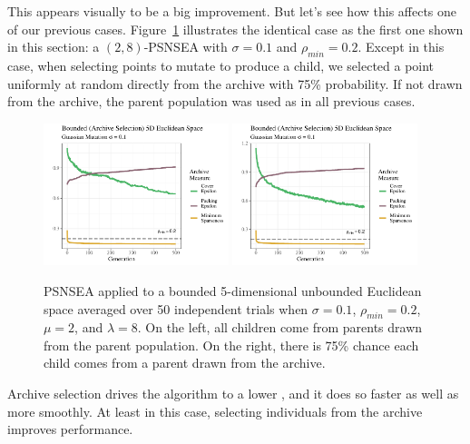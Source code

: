 \documentclass[twoside]{article}
\begin{document}
This appears visually to be a big improvement.  But let's see how this affects one of our previous cases.  Figure~\ref{fig:bounded:viz:mu2lam8:0102} illustrates the identical case as the first one shown in this section:  a $(2,8)$-PSNSEA with $\sigma=0.1$ and $\rho_{min}=0.2$.  Except in this case, when selecting points to mutate to produce a child, we selected a point uniformly at random directly from the archive with 75\% probability.  If not drawn from the archive, the parent population was used as in all previous cases.
%
\begin{figure}[h]
  \includegraphics[width=0.48\textwidth]{Figures/bounded-500-s01r02-mu2lam8.pdf}
  \includegraphics[width=0.48\textwidth]{Figures/boundedrv-500-vizexamp-mu2lam8-full.pdf}
  \caption{\label{fig:bounded:viz:mu2lam8:0102} PSNSEA applied to a bounded 5-dimensional unbounded Euclidean space averaged over 50 independent trials when $\sigma=0.1$, $\rho_{min}=0.2$, $\mu=2$, and $\lambda=8$.  On the left, all children come from parents drawn from the parent population.  On the right, there is 75\% chance each child comes from a parent drawn from the archive.}
\end{figure}

Archive selection drives the algorithm to a lower , and it does so faster as well as more smoothly.  At least in this case, selecting individuals from the archive improves performance.  
\end{document}
